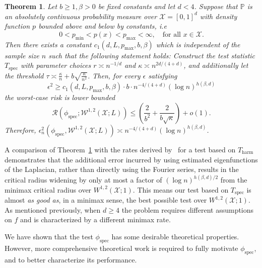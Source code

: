 \documentclass{article}
\newcommand{\1}{\mathbf{1}}
\newcommand{\Pbb}{\mathbb{P}}
\theoremstyle{alden}
\theoremstyle{aldenthm}
\newtheorem{theorem}{Theorem}
\theoremstyle{definition}
\theoremstyle{remark}
\begin{document}
\begin{theorem}
	\label{thm:sobolev_testing_rate}
	Let $b \geq 1,\beta > 0$ be fixed constants and let $d < 4$. Suppose that $\Pbb$ is an absolutely continuous probability measure over $\mathcal{X} = [0,1]^d$ with density function $p$ bounded above and below by constants, i.e
	\begin{equation*}
	0 < p_{\textrm{min}} < p(x) < p_{\textrm{max}} < \infty, \quad \textrm{for all $x \in \mathcal{X}$.}
	\end{equation*}
	Then there exists a constant $c_1(d,L,p_{\max},b,\beta)$ which is independent of the sample size $n$ such that the following statement holds: Construct the test statistic $T_{\mathrm{spec}}$ with parameter choices $r \asymp n^{-1/d}$ and $\kappa \asymp n^{2d/(4+d)}$, and additionally let the threshold $\tau \asymp \frac{\kappa}{n} + b\sqrt{\frac{\kappa}{n^2}}$. Then, for every $\epsilon$ satisfying
	\begin{equation}
	\label{eqn:sobolev_testing_rate}
	\epsilon^2 \geq c_1(d,L,p_{\max},b,\beta) \cdot b \cdot n^{-4/(4 + d)} (\log n)^{h(\beta,d)}
	\end{equation}
	the worst-case risk is lower bounded
	\begin{equation}
	\label{eqn:sobolev_testing_rate_1}
	\mathcal{R}(\phi_{\mathrm{spec}}; \mathcal{W}^{1,2}(\mathcal{X};L)) \leq \left(\frac{2}{b^2} + \frac{2}{b\sqrt{\kappa}}\right) + o(1).
	\end{equation}
	Therefore, $\epsilon_n^2(\phi_{\mathrm{spec}}, \mathcal{W}^{1,2}(\mathcal{X};L)) \asymp  n^{-4/(4 + d)} (\log n)^{h(\beta,d)}$. 
\end{theorem}

A comparison of Theorem~\ref{thm:sobolev_testing_rate} with the rates derived by~\citet{ingster09} for a test based on $T_{\mathrm{harm}}$ demonstrates that the additional error incurred by using estimated eigenfunctions of the Laplacian, rather than directly using the Fourier series, results in the critical radius widening by only at most a factor of $(\log n)^{h(\beta,d)/2}$ from the minimax critical radius over $W^{1,2}(\mathcal{X};1)$. This means our test based on $T_{\textrm{spec}}$ is almost \textit{as good as}, in a minimax sense, the best possible test over $W^{1,2}(\mathcal{X};1)$. As mentioned previously, when $d \geq 4$ the problem  requires different assumptions on $f$ and is characterized by a different minimax rate.

We have shown that the test $\phi_{\mathrm{spec}}$ has some desirable theoretical properties. However, more comprehensive theoretical work is required to fully motivate $\phi_{\mathrm{spec}}$, and to better characterize its performance.
\end{document}
